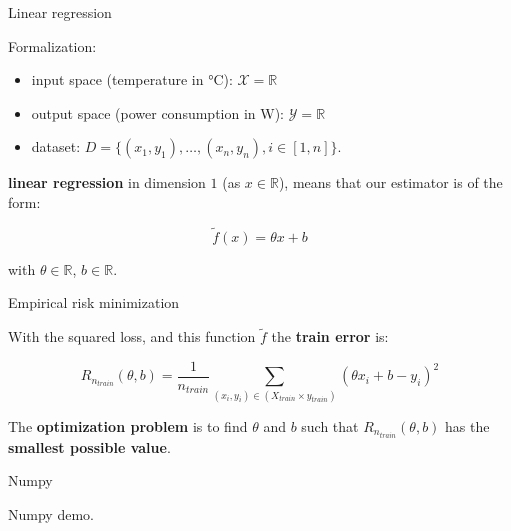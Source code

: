 \documentclass[usenames,dvipsnames,french]{beamer}
\begin{document}
\begin{frame}{Linear regression}

    Formalization:
    \begin{itemize}
        \item input space (temperature in °C): $\mathcal{X} = \mathbb{R}$
        \item output space (power consumption in W): $ \mathcal{Y} = \mathbb{R}$
	\item dataset: $D=\{(x_1, y_1), \dots, (x_n, y_n), i\in[1, n]\}$.
    \end{itemize}

    \textbf{linear regression} in dimension $1$ (as $x\in \mathbb{R}$), means that our estimator is of the form:

    \begin{equation}
        \tilde{f}(x) = \theta x + b
    \end{equation}

    with $\theta\in \mathbb{R}$, $b\in \mathbb{R}$.

\end{frame}

\begin{frame}{Empirical risk minimization}

    With the squared loss, and this function $ \tilde{f}$ the \textbf{train error} is:

    \begin{equation}
	R_{n_{train}}(\theta, b) = \frac{1}{n_{train}} \sum_{(x_i, y_i)\in (X_{train}\times y_{train})} (\theta x_i+b-y_i)^2
    \end{equation}

    The \textbf{optimization problem} is to find $\theta$ and $b$ such that $R_{n_{train}}(\theta, b)$ has the
    \textbf{smallest possible value}. 
\end{frame}

\begin{frame}{Numpy}

    Numpy demo.

\end{frame}
\end{document}
